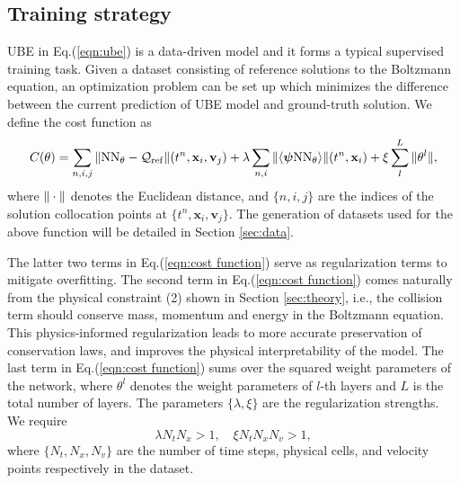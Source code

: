 \documentclass[preprint,3p,12pt,sort&compress]{elsarticle}
\begin{document}
\subsection{Training strategy}\label{sec:loss}

UBE in Eq.(\ref{eqn:ube}) is a data-driven model and it forms a typical supervised training task.
Given a dataset consisting of reference solutions to the Boltzmann equation, an optimization problem can be set up which minimizes the difference between the current prediction of UBE model and ground-truth solution.
We define the cost function as
\begin{equation}
    C(\theta) = \sum_{n,i,j} \Arrowvert \mathrm{NN}_\theta - \mathcal Q_\mathrm{ref} \Arrowvert (t^n,\mathbf x_i,\mathbf v_j) + \lambda \sum_{n,i} \Arrowvert \langle \boldsymbol\psi \mathrm{NN}_\theta \rangle \Arrowvert (t^n,\mathbf x_i) + \xi \sum_l^L \Arrowvert \theta^l \Arrowvert,
    \label{eqn:cost function}
\end{equation}
where $\Arrowvert\cdot\Arrowvert$ denotes the Euclidean distance, and $\{n,i,j\}$ are the indices of the solution collocation points at $\{t^n, \mathbf x_i, \mathbf v_j\}$.
The generation of datasets used for the above function will be detailed in Section \ref{sec:data}.

The latter two terms in Eq.(\ref{eqn:cost function}) serve as regularization terms to mitigate overfitting.
The second term in Eq.(\ref{eqn:cost function}) comes naturally from the physical constraint (2) shown in Section \ref{sec:theory},
i.e., the collision term should conserve mass, momentum and energy in the Boltzmann equation.
This physics-informed regularization \cite{nabian2018physics} leads to more accurate preservation of conservation laws, and improves the physical interpretability of the model.
The last term in Eq.(\ref{eqn:cost function}) sums over the squared weight parameters of the network, where $\theta^l$ denotes the weight parameters of $l$-th layers and $L$ is the total number of layers.
The parameters $\{\lambda,\xi\}$ are the regularization strengths.
We require
\begin{equation}
    \lambda N_t N_x > 1, \quad \xi N_t N_x N_v > 1,
    \label{eqn:regularization strength}
\end{equation}
where $\{N_t,N_x,N_v\}$ are the number of time steps, physical cells, and velocity points respectively in the dataset.
\end{document}
